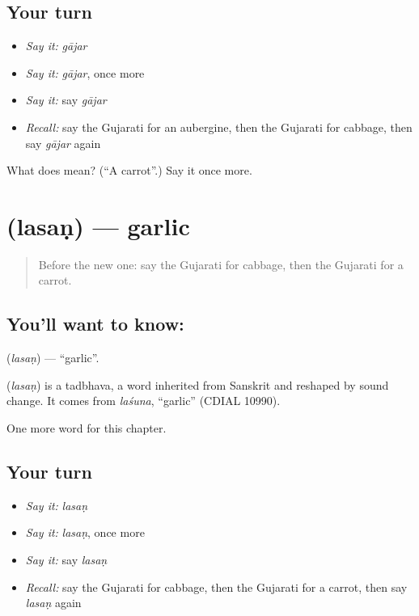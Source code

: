 \subsection*{Your turn}
\begin{itemize}
\raggedright
  \item \emph{Say it:} \emph{gājar}
  \item \emph{Say it:} \emph{gājar}, once more
  \item \emph{Say it:} say \emph{gājar}
  \item \emph{Recall:} say the Gujarati for an aubergine, then the Gujarati for cabbage, then say \emph{gājar} again
\end{itemize}

\begin{tcolorbox}[breakable,colback=teal!4,colframe=teal!35!black,title={Before you move on}]
What does  mean? (\textquotedblleft{}A carrot\textquotedblright{}.) Say it once more.
\end{tcolorbox}
\section[\texorpdfstring{\gu{લસણ} (lasaṇ)}{લસણ (lasaṇ)}]{ (lasaṇ) — garlic}

\label{lesson:GU-C115-lasan}



\begin{quote}
Before the new one: say the Gujarati for cabbage, then the Gujarati for a carrot.
\end{quote}

\subsection*{You'll want to know: }
\textbf{} (\emph{lasaṇ}) — \textquotedblleft{}garlic\textquotedblright{}.

\begin{cousinweb}
\textbf{} (\emph{lasaṇ}) is a tadbhava, a word inherited from Sanskrit and reshaped by sound change. It comes from \emph{laśuna}, \textquotedblleft{}garlic\textquotedblright{} (CDIAL 10990).
\end{cousinweb}

\begin{grammarlens}[title={What you've built}]
One more word for this chapter.
\end{grammarlens}

\subsection*{Your turn}
\begin{itemize}
\raggedright
  \item \emph{Say it:} \emph{lasaṇ}
  \item \emph{Say it:} \emph{lasaṇ}, once more
  \item \emph{Say it:} say \emph{lasaṇ}
  \item \emph{Recall:} say the Gujarati for cabbage, then the Gujarati for a carrot, then say \emph{lasaṇ} again
\end{itemize}

